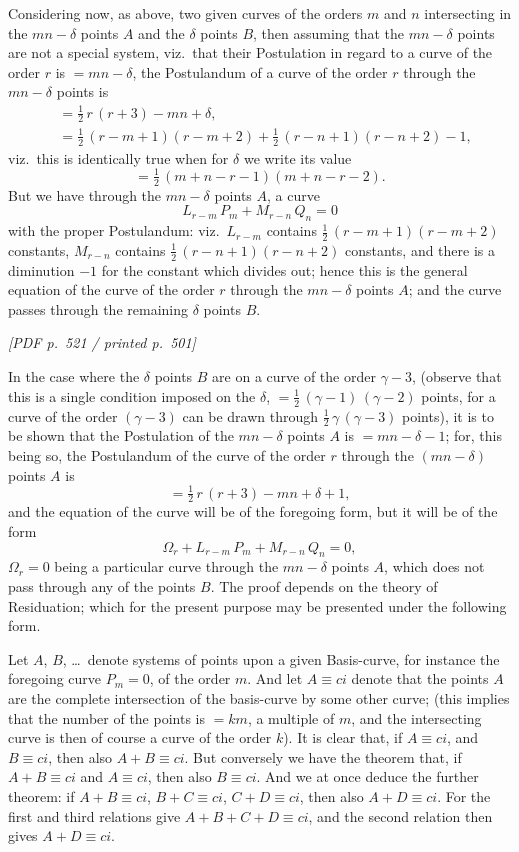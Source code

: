 \documentclass[11pt]{article}
\begin{document}
Considering now, as above, two given curves of the orders $m$ and $n$ intersecting in the $mn - \delta$ points $A$ and the $\delta$ points $B$, then assuming that the $mn - \delta$ points are not a special system, viz.\ that their Postulation in regard to a curve of the order $r$ is $= mn - \delta$, the Postulandum of a curve of the order $r$ through the $mn - \delta$ points is
\begin{align*}
&= \tfrac{1}{2}\,r\,(r + 3) - mn + \delta, \\
&= \tfrac{1}{2}\,(r - m + 1)(r - m + 2) + \tfrac{1}{2}\,(r - n + 1)(r - n + 2) - 1,
\end{align*}
viz.\ this is identically true when for $\delta$ we write its value
\[
= \tfrac{1}{2}\,(m + n - r - 1)(m + n - r - 2).
\]
But we have through the $mn - \delta$ points $A$, a curve
\[
L_{r-m}\,P_{m} + M_{r-n}\,Q_{n} = 0
\]
with the proper Postulandum: viz.\ $L_{r-m}$ contains $\tfrac{1}{2}\,(r - m + 1)(r - m + 2)$ constants, $M_{r-n}$ contains $\tfrac{1}{2}\,(r - n + 1)(r - n + 2)$ constants, and there is a diminution $-1$ for the constant which divides out; hence this is the general equation of the curve of the order $r$ through the $mn - \delta$ points $A$; and the curve passes through the remaining $\delta$ points $B$.

\vfill
\noindent\textit{[PDF p.~521 / printed p.~501]}
\newpage

\noindent In the case where the $\delta$ points $B$ are on a curve of the order $\gamma - 3$, (observe that this is a single condition imposed on the $\delta$, $= \tfrac{1}{2}\,(\gamma - 1)\,(\gamma - 2)$ points, for a curve of the order $(\gamma - 3)$ can be drawn through $\tfrac{1}{2}\,\gamma\,(\gamma - 3)$ points), it is to be shown that the Postulation of the $mn - \delta$ points $A$ is $= mn - \delta - 1$; for, this being so, the Postulandum of the curve of the order $r$ through the $(mn - \delta)$ points $A$ is
\[
= \tfrac{1}{2}\,r\,(r + 3) - mn + \delta + 1,
\]
and the equation of the curve will be of the foregoing form, but it will be of the form
\[
\Omega_{r} + L_{r-m}\,P_{m} + M_{r-n}\,Q_{n} = 0,
\]
$\Omega_{r} = 0$ being a particular curve through the $mn - \delta$ points $A$, which does not pass through any of the points $B$. The proof depends on the theory of Residuation; which for the present purpose may be presented under the following form.

Let $A$, $B$, \ldots\ denote systems of points upon a given Basis-curve, for instance the foregoing curve $P_{m} = 0$, of the order $m$. And let $A \equiv ci$ denote that the points $A$ are the complete intersection of the basis-curve by some other curve; (this implies that the number of the points is $= km$, a multiple of $m$, and the intersecting curve is then of course a curve of the order $k$). It is clear that, if $A \equiv ci$, and $B \equiv ci$, then also $A + B \equiv ci$. But conversely we have the theorem that, if $A + B \equiv ci$ and $A \equiv ci$, then also $B \equiv ci$. And we at once deduce the further theorem: if $A + B \equiv ci$, $B + C \equiv ci$, $C + D \equiv ci$, then also $A + D \equiv ci$. For the first and third relations give $A + B + C + D \equiv ci$, and the second relation then gives $A + D \equiv ci$.
\end{document}
